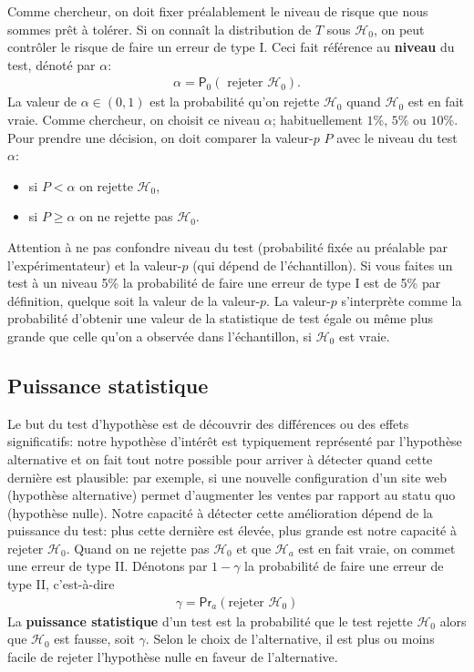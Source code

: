 \documentclass[
  11pt,
  letterpaper,
]{book}
\providecommand{\tightlist}{%
  \setlength{\itemsep}{0pt}\setlength{\parskip}{0pt}}
\begin{document}
Comme chercheur, on doit fixer préalablement le niveau de risque que nous sommes prêt à tolérer. Si on connaît la distribution de \(T\) sous \(\mathscr{H}_0\), on peut contrôler le risque de faire un erreur de type I. Ceci fait référence au \textbf{niveau} du test, dénoté par \(\alpha\):
\begin{align*}
\alpha = \mathsf{P}_0\left(\text{ rejeter } \mathscr{H}_0\right).
\end{align*}
La valeur de \(\alpha \in (0, 1)\) est la probabilité qu'on rejette \(\mathscr{H}_0\) quand \(\mathscr{H}_0\) est en fait vraie. Comme chercheur, on choisit ce niveau \(\alpha\); habituellement \(1\)\%, \(5\)\% ou \(10\)\%. Pour prendre une décision, on doit comparer la valeur-\(p\) \(P\) avec le niveau du test \(\alpha\):

\begin{itemize}
\tightlist
\item
  si \(P < \alpha\) on rejette \(\mathscr{H}_0\),
\item
  si \(P \geq \alpha\) on ne rejette pas \(\mathscr{H}_0\).
\end{itemize}

Attention à ne pas confondre niveau du test (probabilité fixée au préalable par l'expérimentateur) et la valeur-\(p\) (qui dépend de l'échantillon). Si vous faites un test à un niveau 5\% la
probabilité de faire une erreur de type I est de 5\% par définition, quelque soit la
valeur de la valeur-\(p\). La valeur-\(p\) s'interprète comme la probabilité d'obtenir une valeur de
la statistique de test égale ou même plus grande que celle qu'on a observée dans l'échantillon, si \(\mathscr{H}_0\) est vraie.

\hypertarget{puissance-statistique}{%
\subsection{Puissance statistique}\label{puissance-statistique}}

Le but du test d'hypothèse est de découvrir des différences ou des effets significatifs: notre hypothèse d'intérêt est typiquement représenté par l'hypothèse alternative et on fait tout notre possible pour arriver à détecter quand cette dernière est plausible: par exemple, si une nouvelle configuration d'un site web (hypothèse alternative) permet d'augmenter les ventes par rapport au statu quo (hypothèse nulle). Notre capacité à détecter cette amélioration dépend de la puissance du test: plus cette dernière est élevée, plus grande est notre capacité à rejeter \(\mathscr{H}_0\).
Quand on ne rejette pas \(\mathscr{H}_0\) et que \(\mathscr{H}_a\) est en fait vraie, on commet une erreur de type II. Dénotons par \(1-\gamma\) la probabilité de faire une erreur de type II, c'est-à-dire
\begin{align*}
\gamma = \mathsf{Pr}_a(\text{rejeter } \mathscr{H}_0)
\end{align*}
La \textbf{puissance statistique} d'un test est la probabilité que le test rejette \(\mathscr{H}_0\) alors que \(\mathscr{H}_0\) est fausse, soit \(\gamma\). Selon le choix de l'alternative, il est plus ou moins facile de rejeter l'hypothèse nulle en faveur de l'alternative.
\end{document}
